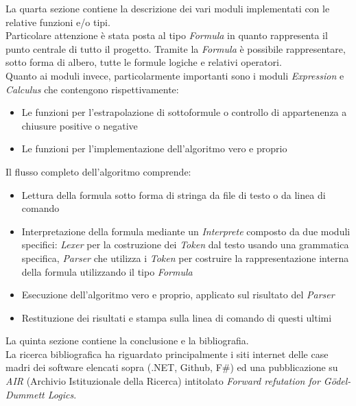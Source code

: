 \documentclass{oist}
\begin{document}
La quarta sezione contiene la descrizione dei vari moduli implementati con le relative funzioni e/o tipi. \\
Particolare attenzione è stata posta al tipo \textit{Formula} in quanto rappresenta il punto centrale di tutto il progetto. Tramite la \textit{Formula} è possibile rappresentare, sotto forma di albero, tutte le formule logiche e relativi operatori. \\
Quanto ai moduli invece, particolarmente importanti sono i moduli \textit{Expression} e \textit{Calculus} che contengono rispettivamente:
\begin{itemize}
    \item Le funzioni per l'estrapolazione di sottoformule o controllo di appartenenza a chiusure positive o negative
    \item Le funzioni per l'implementazione dell'algoritmo vero e proprio
\end{itemize}
Il flusso completo dell'algoritmo comprende:
\begin{itemize}
    \item Lettura della formula sotto forma di stringa da file di testo o da linea di comando
    \item Interpretazione della formula mediante un \textit{Interprete} composto da due moduli specifici: \textit{Lexer} per la costruzione dei \textit{Token} dal testo usando una grammatica specifica, \textit{Parser} che utilizza i \textit{Token} per costruire la rappresentazione interna della formula utilizzando il tipo \textit{Formula}
    \item Esecuzione dell'algoritmo vero e proprio, applicato sul risultato del \textit{Parser}
    \item Restituzione dei risultati e stampa sulla linea di comando di questi ultimi
\end{itemize}

La quinta sezione contiene la conclusione e la bibliografia. \\
La ricerca bibliografica ha riguardato principalmente i siti internet delle case madri dei software elencati sopra (.NET, Github, F\#) ed una pubblicazione su \textit{AIR} (Archivio Istituzionale della Ricerca) intitolato \textit{Forward refutation for G\"odel-Dummett Logics}. \\

\printbibliography
{}
\end{document}
